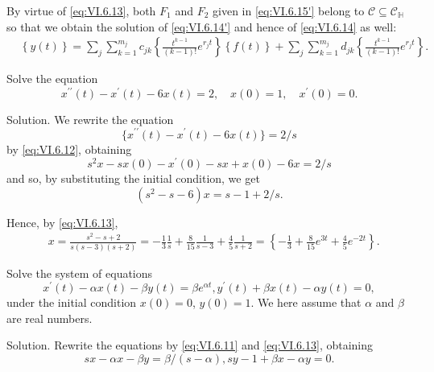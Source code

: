 By virtue of \eqref{eq:VI.6.13}, both $F_{1}$ and $F_{2}$ given in \eqref{eq:VI.6.15'} belong to $\mathcal{C} \subseteq \mathcal{C}_{\mathbb{H}}$ so that we obtain the solution of \eqref{eq:VI.6.14'} and hence of \eqref{eq:VI.6.14} as well: 
\begin{equation}\label{eq:VI.6.16}
\begin{aligned}
&\left\{y (t) \right\} = \sum\limits_{j} \sum\limits_{k=1} ^ {m _{j}} c _{jk} \left\{\frac {t ^{k-1}}{(k - 1) !} e ^ {r _{j} t} \right\} \left\{f (t) \right\} + \sum\limits_{j} \sum\limits_{k=1} ^ {m _{j}} d _{jk} \left\{\frac {t ^{k-1}}{(k - 1) !} e ^ {r _{j} t} \right\}.
\end{aligned}
\end{equation}

\begin{example}\label{ex:VI.6.Example.1} Solve the equation 
\[
x ^{\prime \prime} (t) - x ^{\prime} (t) - 6 x (t) = 2, \quad x (0) = 1, \quad x ^{\prime} (0) = 0.
\]
\end{example}

Solution. We rewrite the equation 
\[
\{x ^{\prime \prime} (t) - x ^{\prime} (t) - 6 x (t) \} = 2 / s
\]
by \eqref{eq:VI.6.12}, obtaining 
\[
s ^{2} x - s x (0) - x ^{\prime} (0) - s x + x (0) - 6 x = 2 / s
\]
and so, by substituting the initial condition, we get 
\[
(s ^{2} - s - 6) x = s - 1 + 2 / s.
\]

Hence, by \eqref{eq:VI.6.13}, 
\[
\begin{aligned}
&x = \frac {s ^{2} - s + 2}{s (s - 3) (s + 2)} = - \frac {1}{3} \frac {1}{s} + \frac {8}{1 5} \frac {1}{s - 3} + \frac {4}{5} \frac {1}{s + 2} = \left\{- \frac {1}{3} + \frac {8}{1 5} e ^{3t} + \frac {4}{5} e ^{-2t} \right\}.
\end{aligned}
\]

\begin{example}\label{ex:VI.6.Example.2} Solve the system of equations 
\[
x ^{\prime} (t) - \alpha x (t) - \beta y (t) = \beta e ^{\alpha t}, y ^{\prime} (t) + \beta x (t) - \alpha y (t) = 0,
\]
under the initial condition $x(0)=0$, $y(0)=1$. We here assume that $\alpha$ and $\beta$ are real numbers. 
\end{example}

Solution. Rewrite the equations by \eqref{eq:VI.6.11} and \eqref{eq:VI.6.13}, obtaining 
\[
s x - \alpha x - \beta y = \beta / (s - \alpha), s y - 1 + \beta x - \alpha y = 0.
\]

